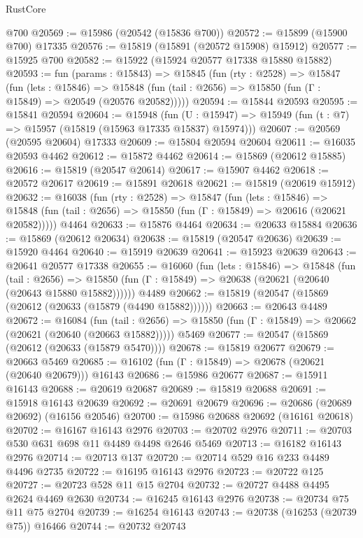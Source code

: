 \begin{lexlean}{RustCore}
\begin{coremodule}
    @700
@20569 := @15986 (@20542 (@15836 @700))
@20572 := @15899 (@15900 @700) @17335
@20576 := @15819 (@15891 (@20572 @15908) @15912)
@20577 := @15925 @700
@20582 := @15922 (@15924 @20577 @17338 @15880 @15882)
@20593 := fun (params : @15843) =>
  @15845
    (fun (rty : @2528) =>
    @15847
      (fun (lets : @15846) =>
      @15848 (fun (tail : @2656) => @15850 (fun (Γ : @15849) => @20549 (@20576 @20582)))))
@20594 := @15844 @20593
@20595 := @15841 @20594
@20604 := @15948
    (fun (U : @15947) => @15949 (fun (t : @7) => @15957 (@15819 (@15963 @17335 @15837) @15974)))
@20607 := @20569 (@20595 @20604) @17333
@20609 := @15804 @20594 @20604
@20611 := @16035 @20593 @4462
@20612 := @15872 @4462
@20614 := @15869 (@20612 @15885)
@20616 := @15819 (@20547 @20614)
@20617 := @15907 @4462
@20618 := @20572 @20617
@20619 := @15891 @20618
@20621 := @15819 (@20619 @15912)
@20632 := @16038
    (fun (rty : @2528) =>
    @15847
      (fun (lets : @15846) =>
      @15848 (fun (tail : @2656) => @15850 (fun (Γ : @15849) => @20616 (@20621 @20582)))))
    @4464
@20633 := @15876 @4464
@20634 := @20633 @15884
@20636 := @15869 (@20612 @20634)
@20638 := @15819 (@20547 @20636)
@20639 := @15920 @4464
@20640 := @15919 @20639
@20641 := @15923 @20639
@20643 := @20641 @20577 @17338
@20655 := @16060
    (fun (lets : @15846) =>
    @15848
      (fun (tail : @2656) =>
      @15850 (fun (Γ : @15849) => @20638 (@20621 (@20640 (@20643 @15880 @15882))))))
    @4489
@20662 := @15819 (@20547 (@15869 (@20612 (@20633 (@15879 (@4490 @15882))))))
@20663 := @20643 @4489
@20672 := @16084
    (fun (tail : @2656) => @15850 (fun (Γ : @15849) => @20662 (@20621 (@20640 (@20663 @15882)))))
    @5469
@20677 := @20547 (@15869 (@20612 (@20633 (@15879 @5470))))
@20678 := @15819 @20677
@20679 := @20663 @5469
@20685 := @16102 (fun (Γ : @15849) => @20678 (@20621 (@20640 @20679))) @16143
@20686 := @15986 @20677
@20687 := @15911 @16143
@20688 := @20619 @20687
@20689 := @15819 @20688
@20691 := @15918 @16143 @20639
@20692 := @20691 @20679
@20696 := @20686 (@20689 @20692) (@16156 @20546)
@20700 := @15986 @20688 @20692 (@16161 @20618)
@20702 := @16167 @16143 @2976
@20703 := @20702 @2976
@20711 := @20703 @530 @631 @698 @11 @4489 @4498 @2646 @5469
@20713 := @16182 @16143 @2976
@20714 := @20713 @137
@20720 := @20714 @529 @16 @233 @4489 @4496 @2735
@20722 := @16195 @16143 @2976
@20723 := @20722 @125
@20727 := @20723 @528 @11 @15 @2704
@20732 := @20727 @4488 @4495 @2624 @4469 @2630
@20734 := @16245 @16143 @2976
@20738 := @20734 @75 @11 @75 @2704
@20739 := @16254 @16143
@20743 := @20738 (@16253 (@20739 @75)) @16466
@20744 := @20732 @20743

\end{coremodule}
\end{lexlean}
